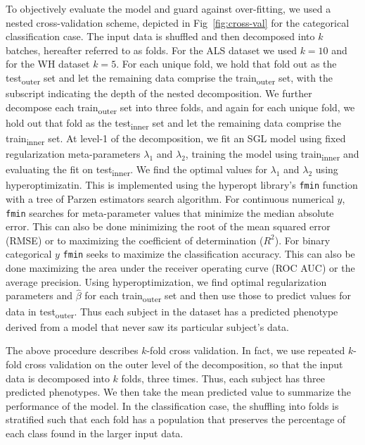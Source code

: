 To objectively evaluate the model and guard against over-fitting, we used a
nested cross-validation scheme, depicted in Fig~\ref{fig:cross-val} for the
categorical classification case. The input data is shuffled and then decomposed
into $k$ batches, hereafter referred to as folds. For the ALS dataset we used
$k=10$ and for the WH dataset $k=5$. For each unique fold, we hold that fold out
as the test\textsubscript{outer} set and let the remaining data comprise the
train\textsubscript{outer} set, with the subscript indicating the depth of the
nested decomposition. We further decompose each train\textsubscript{outer} set
into three folds, and again for each unique fold, we hold out that fold as the
test\textsubscript{inner} set and let the remaining data comprise the
train\textsubscript{inner} set. At level-1 of the decomposition, we fit an SGL
model using fixed regularization meta-parameters $\lambda_1$ and $\lambda_2$,
training the model using train\textsubscript{inner} and evaluating the fit on
test\textsubscript{inner}. We find the optimal values for $\lambda_1$ and
$\lambda_2$ using hyperoptimizatin. This is implemented using the hyperopt
library's \verb|fmin| function\cite{Bergstra_2015} with a tree of Parzen
estimators search algorithm\cite{bergstra2011algorithms}. For continuous
numerical $y$, \verb|fmin| searches for meta-parameter values that minimize the
median absolute error. This can also be done minimizing the root of the mean
squared error (RMSE) or to maximizing the coefficient of determination ($R^2$).
For binary categorical $y$ \verb|fmin| seeks to maximize the classification
accuracy. This can also be done maximizing the area under the receiver operating
curve (ROC AUC) or the average precision. Using hyperoptimization, we find
optimal regularization parameters and $\widehat{\beta}$ for each
train\textsubscript{outer} set and then use those to predict values for data in
test\textsubscript{outer}. Thus each subject in the dataset has a predicted
phenotype derived from a model that never saw its particular subject's data.

The above procedure describes $k$-fold cross validation. In fact, we use
repeated $k$-fold cross validation on the outer level of the decomposition, so
that the input data is decomposed into $k$ folds, three times. Thus, each
subject has three predicted phenotypes. We then take the mean predicted value to
summarize the performance of the model. In the classification case, the
shuffling into folds is stratified such that each fold has a population that
preserves the percentage of each class found in the larger input data.

